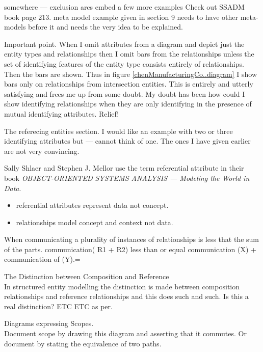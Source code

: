\mynote somewhere --- exclusion arcs
\mynote embed a few more examples Check out SSADM book page 213. 
\mynote meta model example given in section 9 needs to have other meta-models before it and needs the very idea to be explained.

\begin{notebox}
Important point. When I omit attributes from a diagram and depict just the entity types and relationships then I omit bars from the relationships unless the set of identifying features of the entity type consists entirely of relationships. Then the bars are shown.
Thus in figure \ref{chenManufacturingCo..diagram} I show bars only on relationships from intersection entities. This is entirely and utterly satisfying and frees me up from some doubt. My doubt has been how could I show identifying relationships when they are only identifying in the presence of 
mutual identifying attributes. Relief! 
\end{notebox}




\begin{noteforfuture}
The referecing entities section. I would like an example with two or three identifying attributes but --- cannot think of one. The ones I have given earlier are not very convincing.
\end{noteforfuture}

\begin{noteforfuture}
 Sally Shlaer and Stephen J. Mellor use the term referential attribute
in their book \textit{OBJECT-ORIENTED SYSTEMS ANALYSIS --- Modeling the World in Data}.
\end{noteforfuture}



\begin{noteforfuture}
\begin{itemize}
\item referential attributes represent data not concept.
\item relationships model concept and context not data. 
\end{itemize}
\end{noteforfuture}

\begin{noteforfuture}
When communicating a plurality of instances of relationships is less that the sum of the parts.
communication( R1 + R2) less than or equal communication (X) + communication of (Y).=
\end{noteforfuture}

\begin{noteforfuture}
 The Distinction between Composition and Reference \\
In structured entity modelling the distinction is made between composition relationships and reference relationships and this does such and such. Is this a real distinction? ETC ETC as per.

Diagrams expressing Scopes.\\
Document scope by drawing this diagram and asserting that it commutes. Or document by stating the equivalence of two paths. 
\end{noteforfuture}

